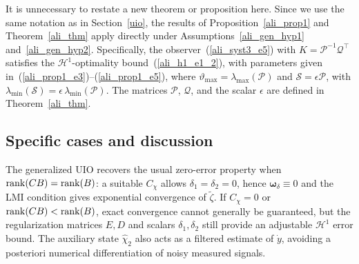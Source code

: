 \documentclass{ifacconf}
\def\eqref#1{(\ref{#1})}
\def\rank{\mathop{{\rm rank}}}
\begin{document}
{%
It is unnecessary to restate a new theorem or proposition here. Since we use the same notation as in Section~\ref{uio}, the results of Proposition~\ref{ali_prop1} and Theorem~\ref{ali_thm} apply directly under Assumptions~\ref{ali_gen_hyp1} and~\ref{ali_gen_hyp2}. 
Specifically, the observer~\eqref{ali_syst3_e5} with $ K = \mathcal{P}^{-1}\mathcal{Q}^{\top} $ satisfies the $\mathcal{H}^{1}$-optimality bound~\eqref{ali_h1_e1_2}, with parameters given in~\eqref{ali_prop1_e3}--\eqref{ali_prop1_e5}, where $\vartheta_{\max} = \lambda_{\max}\!\left( \mathcal{P} \right)$ and $\mathcal{S} = \epsilon \mathcal{P}$, with $\lambda_{\min}\!\left( \mathcal{S} \right) 
= \epsilon\, \lambda_{\min}\!\left( \mathcal{P} \right)$. The matrices $\mathcal{P}$, $\mathcal{Q}$, and the scalar $\epsilon$ are defined in Theorem~\ref{ali_thm}.










\subsection{Specific cases and discussion}
\vspace*{-0.3cm}
%
The generalized UIO recovers the usual zero-error property when $\rank(CB)=\rank(B)$: a suitable $C_\chi$ allows $\delta_1=\delta_2=0$, hence $\bm{\omega}_\delta\equiv0$ and the LMI condition gives exponential convergence of $\tilde{\zeta}$. If $C_\chi=0$ or $\rank(CB)<\rank(B)$, exact convergence cannot generally be guaranteed, but the regularization matrices $E,D$ and scalars $\delta_1,\delta_2$ still provide an adjustable $\mathcal H^1$ error bound. The auxiliary state $\hat{\chi}_2$ also acts as a filtered estimate of $\dot y$, avoiding a posteriori numerical differentiation of noisy measured signals.


}
\end{document}
